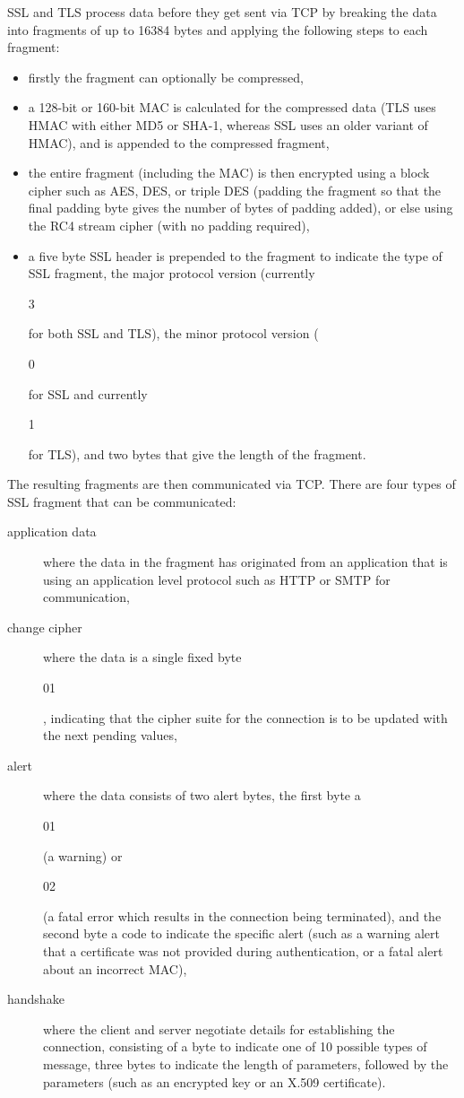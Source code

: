 SSL and TLS process data before they get sent via TCP by breaking the data into fragments
of up to 16384 bytes and applying the following steps to each fragment:
\begin{itemize}
  \item firstly the fragment can optionally be compressed,
  \item a 128-bit or 160-bit MAC is calculated for the compressed data
  (TLS uses HMAC with either MD5 or SHA-1, whereas SSL uses an older variant of HMAC),
  and is appended to the compressed fragment,
  \item the entire fragment (including the MAC) is then encrypted using a block
  cipher such as AES, DES, or triple DES (padding the fragment so that the final
  padding byte gives the number of bytes of padding added),
  or else using the RC4 stream cipher (with no padding required),
  \item a five byte SSL header is prepended to the fragment to indicate the type of SSL fragment,
  the major protocol version (currently \begin{code}3\end{code} for both SSL and TLS),
  the minor protocol version (\begin{code}0\end{code} for SSL and currently
  \begin{code}1\end{code} for TLS), and two bytes that give the length of the fragment.
\end{itemize}
The resulting fragments are then communicated via TCP.
There are four types of SSL fragment that can be communicated:
\begin{description}
  \item[application data] where the data in the fragment has originated from an
  application that is using an application level protocol such as HTTP or SMTP for communication,
  \item[change cipher] where the data is a single fixed byte \begin{code}01\end{code},
  indicating that the cipher suite for the connection is to be updated with
  the next pending values,
  \item[alert] where the data consists of two alert bytes, the first byte a
  \begin{code}01\end{code} (a warning) or \begin{code}02\end{code}
  (a fatal error which results in the connection being terminated),
  and the second byte a code to indicate the specific alert
  (such as a warning alert that a certificate was not provided during
  authentication, or a fatal alert about an incorrect MAC),
  \item[handshake] where the client and server negotiate details for establishing the connection,
  consisting of a byte to indicate one of 10 possible types of message,
  three bytes to indicate the length of parameters, followed by the parameters
  (such as an encrypted key or an X.509 certificate).
\end{description}
